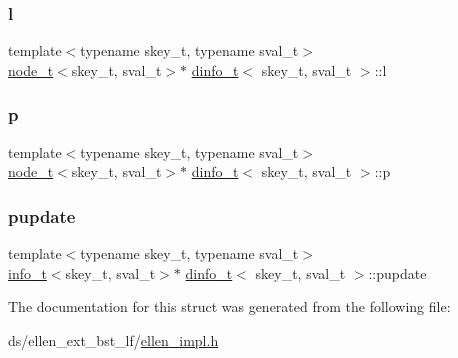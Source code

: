 \subsubsection{\texorpdfstring{l}{l}}
{\footnotesize\ttfamily template$<$typename skey\+\_\+t, typename sval\+\_\+t$>$ \\
\hyperlink{structnode__t}{node\+\_\+t}$<$skey\+\_\+t, sval\+\_\+t$>$$\ast$ \hyperlink{structdinfo__t}{dinfo\+\_\+t}$<$ skey\+\_\+t, sval\+\_\+t $>$\+::l}

\mbox{\label{structdinfo__t_acadd57ec2ca546d36effcea8bcd8494b}} 
\subsubsection{\texorpdfstring{p}{p}}
{\footnotesize\ttfamily template$<$typename skey\+\_\+t, typename sval\+\_\+t$>$ \\
\hyperlink{structnode__t}{node\+\_\+t}$<$skey\+\_\+t, sval\+\_\+t$>$$\ast$ \hyperlink{structdinfo__t}{dinfo\+\_\+t}$<$ skey\+\_\+t, sval\+\_\+t $>$\+::p}

\mbox{\label{structdinfo__t_a550b10645a6869ee2f8e7c6b0c3d3327}} 
\subsubsection{\texorpdfstring{pupdate}{pupdate}}
{\footnotesize\ttfamily template$<$typename skey\+\_\+t, typename sval\+\_\+t$>$ \\
\hyperlink{unioninfo__t}{info\+\_\+t}$<$skey\+\_\+t, sval\+\_\+t$>$$\ast$ \hyperlink{structdinfo__t}{dinfo\+\_\+t}$<$ skey\+\_\+t, sval\+\_\+t $>$\+::pupdate}



The documentation for this struct was generated from the following file\+:\begin{DoxyCompactItemize}
\item 
ds/ellen\+\_\+ext\+\_\+bst\+\_\+lf/\hyperlink{ellen__impl_8h}{ellen\+\_\+impl.\+h}\end{DoxyCompactItemize}
